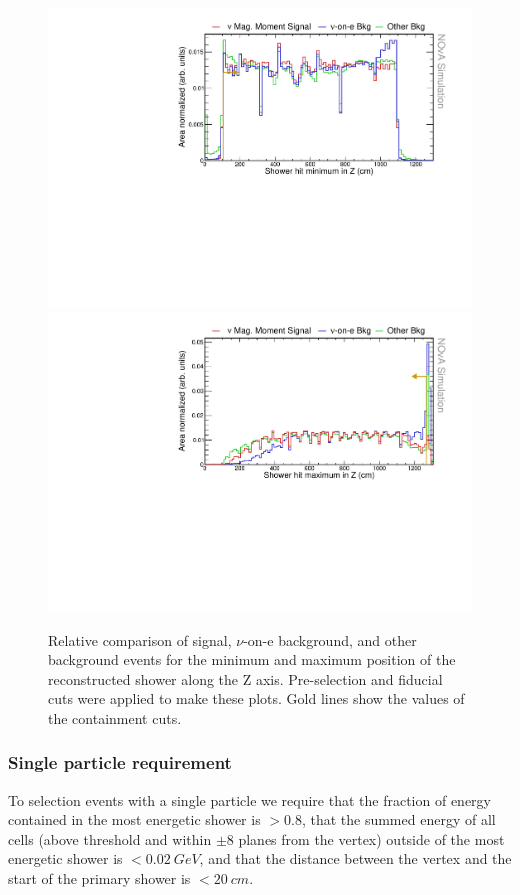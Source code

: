 \begin{figure}[hbtp]
\centering
\includegraphics[width=.9\textwidth]{Plots/NuMMEventSelection/N1Cut_minZ.pdf}
\includegraphics[width=.9\textwidth]{Plots/NuMMEventSelection/N1Cut_maxZ.pdf}
\caption{Relative comparison of signal, $\nu$-on-e background, and other background events for the minimum and maximum position of the reconstructed shower along the Z axis. Pre-selection and fiducial cuts were applied to make these plots. Gold lines show the values of the containment cuts.}
\label{fig:ContainmentCutsZ}
\end{figure}


\subsubsection*{Single particle requirement}

To selection events with a single particle we require that the fraction of energy contained in the most energetic shower is $>0.8$, that the summed energy of all cells (above threshold and within $\pm8$ planes from the vertex) outside of the most energetic shower is $<0.02\ \unit{GeV}$, and that the distance between the vertex and the start of the primary shower is $<20\ \unit{cm}$.

